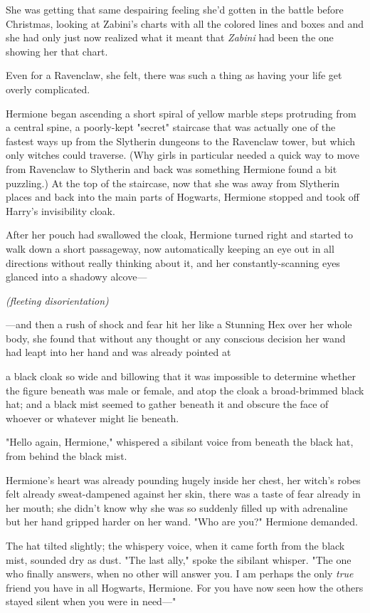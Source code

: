 She was getting that same despairing feeling she'd gotten in the battle before
Christmas, looking at Zabini's charts with all the colored lines and boxes
and{\el} and she had only just now realized what it meant that \emph{Zabini}
had been the one showing her that chart.

Even for a Ravenclaw, she felt, there was such a thing as having your life get
overly complicated.

Hermione began ascending a short spiral of yellow marble steps protruding from
a central spine, a poorly-kept "secret" staircase that was actually one of the
fastest ways up from the Slytherin dungeons to the Ravenclaw tower, but which
only witches could traverse. (Why girls in particular needed a quick way to
move from Ravenclaw to Slytherin and back was something Hermione found a bit
puzzling.) At the top of the staircase, now that she was away from Slytherin
places and back into the main parts of Hogwarts, Hermione stopped and took off
Harry's invisibility cloak.

After her pouch had swallowed the cloak, Hermione turned right and started to
walk down a short passageway, now automatically keeping an eye out in all
directions without really thinking about it, and her constantly-scanning eyes
glanced into a shadowy alcove---

\emph{(fleeting disorientation)}

---and then a rush of shock and fear hit her like a Stunning Hex over her whole
body, she found that without any thought or any conscious decision her wand had
leapt into her hand and was already pointed at{\el}

{\el} a black cloak so wide and billowing that it was impossible to determine
whether the figure beneath was male or female, and atop the cloak a
broad-brimmed black hat; and a black mist seemed to gather beneath it and
obscure the face of whoever or whatever might lie beneath.

"Hello again, Hermione," whispered a sibilant voice from beneath the black hat,
from behind the black mist.

Hermione's heart was already pounding hugely inside her chest, her witch's
robes felt already sweat-dampened against her skin, there was a taste of fear
already in her mouth; she didn't know why she was so suddenly filled up with
adrenaline but her hand gripped harder on her wand. "Who are you?" Hermione
demanded.

The hat tilted slightly; the whispery voice, when it came forth from the black
mist, sounded dry as dust. "The last ally," spoke the sibilant whisper. "The
one who finally answers, when no other will answer you. I am perhaps the only
\emph{true} friend you have in all Hogwarts, Hermione. For you have now seen
how the others stayed silent when you were in need---"

